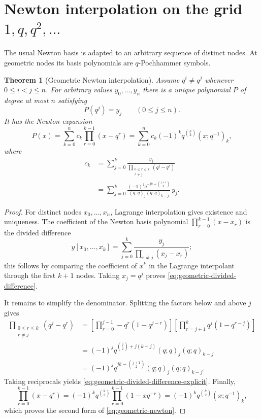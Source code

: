 \documentclass[11pt,a4paper,oneside,openany]{book}
\newtheorem{theorem}{Theorem}[chapter]
\theoremstyle{definition}
\theoremstyle{remark}
\begin{document}
\section{Newton interpolation on the grid \texorpdfstring{$1,q,q^2,\ldots$}{1, q, q-squared, ...}}

The usual Newton basis is adapted to an arbitrary sequence of distinct nodes.  At geometric nodes its basis polynomials are $q$-Pochhammer symbols.

\begin{theorem}[Geometric Newton interpolation]\label{thm:geometric-newton}
Assume $q^i\ne q^j$ whenever $0\le i<j\le n$.  For arbitrary values $y_0,\ldots,y_n$ there is a unique polynomial $P$ of degree at most $n$ satisfying
\[
 P(q^j)=y_j\qquad(0\le j\le n).
\]
It has the Newton expansion
\[
 P(x)=\sum_{k=0}^{n}c_k\prod_{r=0}^{k-1}(x-q^r)
 =\sum_{k=0}^{n}c_k(-1)^kq^{\binom k2}(x;q^{-1})_k,
 \label{eq:geometric-newton}
\]
where
\begin{align}
 c_k
 &=\sum_{j=0}^{k}
 \frac{y_j}{\prod_{\substack{0\le r\le k\\r\ne j}}(q^j-q^r)}
 \label{eq:geometric-divided-difference}\\
 &=\sum_{j=0}^{k}
 \frac{(-1)^j q^{-jk+\binom{j+1}{2}}}{(q;q)_j(q;q)_{k-j}}\,y_j.
 \label{eq:geometric-divided-difference-explicit}
\end{align}
\end{theorem}

\begin{proof}
For distinct nodes $x_0,\ldots,x_n$, Lagrange interpolation gives existence and uniqueness.  The coefficient of the Newton basis polynomial
\(
 \prod_{r=0}^{k-1}(x-x_r)
\)
is the divided difference
\[
 y[x_0,\ldots,x_k]
 =\sum_{j=0}^{k}\frac{y_j}{\prod_{r\ne j}(x_j-x_r)};
\]
this follows by comparing the coefficient of $x^k$ in the Lagrange interpolant through the first $k+1$ nodes.  Taking $x_j=q^j$ proves \eqref{eq:geometric-divided-difference}.

It remains to simplify the denominator.  Splitting the factors below and above $j$ gives
\begin{align*}
 \prod_{\substack{0\le r\le k\\r\ne j}}(q^j-q^r)
 &=\left[\prod_{r=0}^{j-1}-q^r(1-q^{j-r})\right]
   \left[\prod_{r=j+1}^{k}q^j(1-q^{r-j})\right]\\
 &=(-1)^jq^{\binom j2+j(k-j)}(q;q)_j(q;q)_{k-j}\\
 &=(-1)^jq^{jk-\binom{j+1}{2}}(q;q)_j(q;q)_{k-j}.
\end{align*}
Taking reciprocals yields \eqref{eq:geometric-divided-difference-explicit}.  Finally,
\[
 \prod_{r=0}^{k-1}(x-q^r)
 =(-1)^kq^{\binom k2}\prod_{r=0}^{k-1}(1-xq^{-r})
 =(-1)^kq^{\binom k2}(x;q^{-1})_k,
\]
which proves the second form of \eqref{eq:geometric-newton}.
\end{proof}
\end{document}
